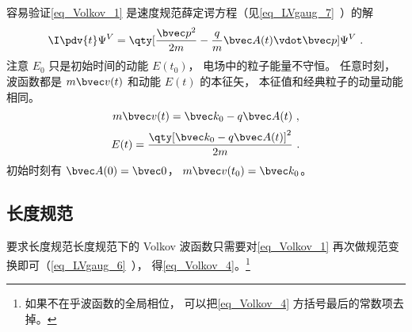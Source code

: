 容易验证\autoref{eq_Volkov_1} 是速度规范薛定谔方程（见\autoref{eq_LVgaug_7}~）的解
\begin{equation}
\I \pdv{t} \Psi^V = \qty[\frac{\bvec p^2}{2m} - \frac{q}{m}\bvec A(t) \vdot \bvec p] \Psi^V~.
\end{equation}
注意 $E_0$ 只是初始时间的动能 $E(t_0)$， 电场中的粒子能量不守恒。 任意时刻， 波函数都是 $m\bvec v(t)$ 和动能 $E(t)$ 的本征矢， 本征值和经典粒子的动量动能相同。
\begin{equation}
m\bvec v(t) = \bvec k_0 - q\bvec A(t)~,
\end{equation}
\begin{equation}
E(t) = \frac{\qty[\bvec k_0 - q\bvec A(t)]^2}{2m}~.
\end{equation}
初始时刻有 $\bvec A(0) = \bvec 0$， $m\bvec v(t_0) = \bvec k_0$。

\subsection{长度规范}
要求长度规范长度规范下的 Volkov 波函数只需要对\autoref{eq_Volkov_1} 再次做规范变换即可（\autoref{eq_LVgaug_6}~）， 得\autoref{eq_Volkov_4}。\footnote{如果不在乎波函数的全局相位， 可以把\autoref{eq_Volkov_4} 方括号最后的常数项去掉。}
